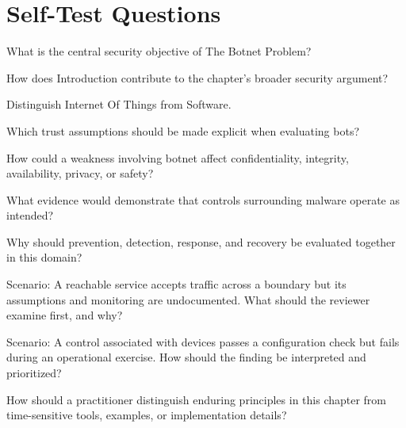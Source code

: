 \documentclass[11pt,letterpaper]{article}
\begin{document}
\section*{Self-Test Questions}
\begin{CornellRecallList}
\item What is the central security objective of The Botnet Problem?
\item How does Introduction contribute to the chapter's broader security argument?
\item Distinguish Internet Of Things from Software.
\item Which trust assumptions should be made explicit when evaluating bots?
\item How could a weakness involving botnet affect confidentiality, integrity, availability, privacy, or safety?
\item What evidence would demonstrate that controls surrounding malware operate as intended?
\item Why should prevention, detection, response, and recovery be evaluated together in this domain?
\item Scenario: A reachable service accepts traffic across a boundary but its assumptions and monitoring are undocumented. What should the reviewer examine first, and why?
\item Scenario: A control associated with devices passes a configuration check but fails during an operational exercise. How should the finding be interpreted and prioritized?
\item How should a practitioner distinguish enduring principles in this chapter from time-sensitive tools, examples, or implementation details?
\end{CornellRecallList}
\end{document}
